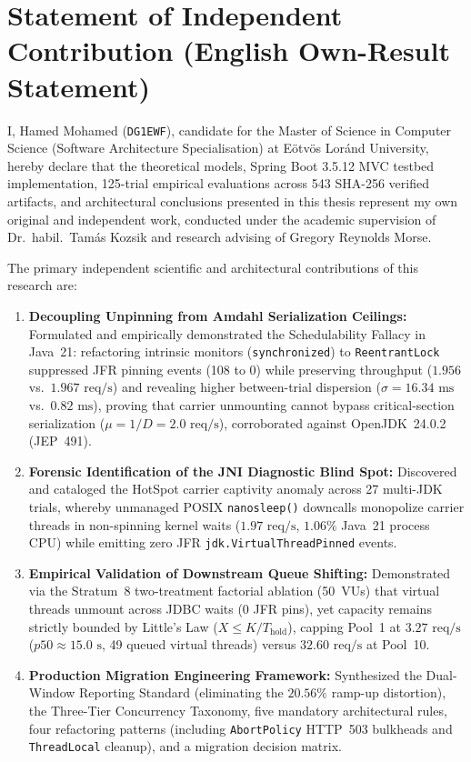 \section{Statement of Independent Contribution (English Own-Result Statement)}
\label{sec:english-own-results}

I, Hamed Mohamed (\texttt{DG1EWF}), candidate for the Master of Science in Computer Science (Software Architecture Specialisation) at Eötvös Loránd University, hereby declare that the theoretical models, Spring Boot 3.5.12 MVC testbed implementation, 125-trial empirical evaluations across 543 SHA-256 verified artifacts, and architectural conclusions presented in this thesis represent my own original and independent work, conducted under the academic supervision of Dr.~habil.\ Tamás Kozsik and research advising of Gregory Reynolds Morse.

The primary independent scientific and architectural contributions of this research are:
\begin{enumerate}
  \item \textbf{Decoupling Unpinning from Amdahl Serialization Ceilings:} Formulated and empirically demonstrated the Schedulability Fallacy in Java~21: refactoring intrinsic monitors (\texttt{synchronized}) to \texttt{ReentrantLock} suppressed JFR pinning events (108 to 0) while preserving throughput ($1.956$ vs.\ $1.967\text{ req/s}$) and revealing higher between-trial dispersion ($\sigma = 16.34\text{ ms}$ vs.\ $0.82\text{ ms}$), proving that carrier unmounting cannot bypass critical-section serialization ($\mu = 1/D = 2.0\text{ req/s}$), corroborated against OpenJDK~24.0.2 (JEP~491).
  \item \textbf{Forensic Identification of the JNI Diagnostic Blind Spot:} Discovered and cataloged the HotSpot carrier captivity anomaly across 27 multi-JDK trials, whereby unmanaged POSIX \texttt{nanosleep()} downcalls monopolize carrier threads in non-spinning kernel waits ($1.97\text{ req/s}$, $1.06\%$ Java~21 process CPU) while emitting zero JFR \texttt{jdk.VirtualThreadPinned} events.
  \item \textbf{Empirical Validation of Downstream Queue Shifting:} Demonstrated via the Stratum~8 two-treatment factorial ablation (50~VUs) that virtual threads unmount across JDBC waits (0 JFR pins), yet capacity remains strictly bounded by Little's Law ($X \le K / T_{\text{hold}}$), capping Pool~1 at $3.27\text{ req/s}$ ($p50 \approx 15.0\text{ s}$, 49 queued virtual threads) versus $32.60\text{ req/s}$ at Pool~10.
  \item \textbf{Production Migration Engineering Framework:} Synthesized the Dual-Window Reporting Standard (eliminating the $20.56\%$ ramp-up distortion), the Three-Tier Concurrency Taxonomy, five mandatory architectural rules, four refactoring patterns (including \texttt{AbortPolicy} HTTP~503 bulkheads and \texttt{ThreadLocal} cleanup), and a migration decision matrix.
\end{enumerate}

